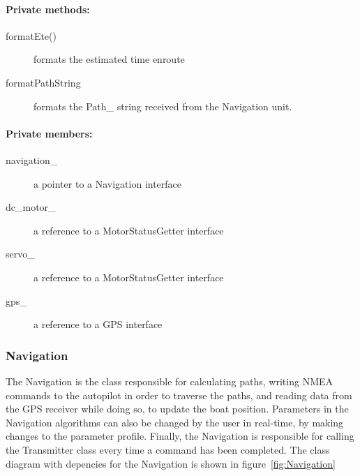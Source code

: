 \paragraph{Private methods:}
\begin{adjustwidth}{2.5em}{0pt}\begin{description}
		\item [formatEte()] formats the estimated time enroute
		\item [formatPathString] formats the Path_ string received from the Navigation unit.
\end{description}\end{adjustwidth}

\paragraph{Private members:}
\begin{adjustwidth}{2.5em}{0pt}\begin{description}
		\item [navigation_] a pointer to a Navigation interface
		\item [dc_motor_] a reference to a MotorStatusGetter interface
		\item [servo_] a reference to a MotorStatusGetter interface
		\item [gps_] a reference to a GPS interface
\end{description}\end{adjustwidth}

\subsubsection{Navigation}

The Navigation is the class responsible for calculating paths, writing NMEA commands to the autopilot in order to traverse the paths, and reading data from the GPS receiver while doing so, to update the boat position. Parameters in the Navigation algorithms can also be changed by the user in real-time, by making changes to the parameter profile. Finally, the Navigation is responsible for calling the Transmitter class every time a command has been completed. The class diagram with depencies for the Navigation is shown in figure~\ref{fig:Navigation}

